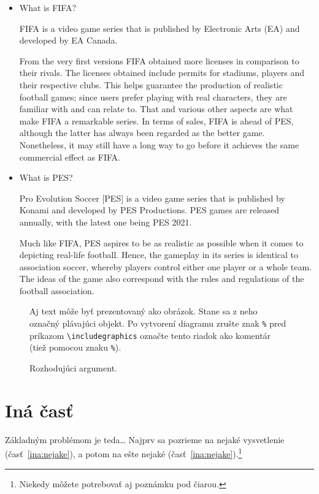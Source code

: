 \documentclass[12pt,twoside,english,a4paper]{article}
\begin{document}
\begin{itemize}
\item What is FIFA?

FIFA is a video game series that is published by Electronic Arts (EA) and developed by EA Canada.

From the very first versions FIFA obtained more licenses in comparison to their rivals. The licenses obtained include permits for stadiums, players and their respective clubs. This helps guarantee the production of realistic football games; since users prefer playing with real characters, they are familiar with and can relate to. That and various other aspects are what make FIFA a remarkable series. In terms of sales, FIFA is ahead of PES, although the latter has always been regarded as the better game. Nonetheless, it may still have a long way to go before it achieves the same commercial effect as FIFA.

\item What is PES?

Pro Evolution Soccer [PES] is a video game series that is published by Konami and developed by PES Productions. PES games are released annually, with the latest one being PES 2021. 

Much like FIFA, PES aspires to be as realistic as possible when it comes to depicting real-life football. Hence, the gameplay in its series is identical to association soccer, whereby players control either one player or a whole team. The ideas of the game also correspond with the rules and regulations of the football association.
	
\end{itemize}


\begin{figure}[tbh]
\centering

Aj text môže byť prezentovaný ako obrázok. Stane sa z neho označný plávajúci objekt. Po vytvorení diagramu zrušte znak \texttt{\%} pred príkazom \verb|\includegraphics| označte tento riadok ako komentár (tiež pomocou znaku \texttt{\%}).
\caption{Rozhodujúci argument.}
\label{f:rozhod}
\end{figure}



\section{Iná časť} \label{ina}

Základným problémom je teda\ldots{} Najprv sa pozrieme na nejaké vysvetlenie (časť~\ref{ina:nejake}), a potom na ešte nejaké (časť~\ref{ina:nejake}).\footnote{Niekedy môžete potrebovať aj poznámku pod čiarou.}
\end{document}
